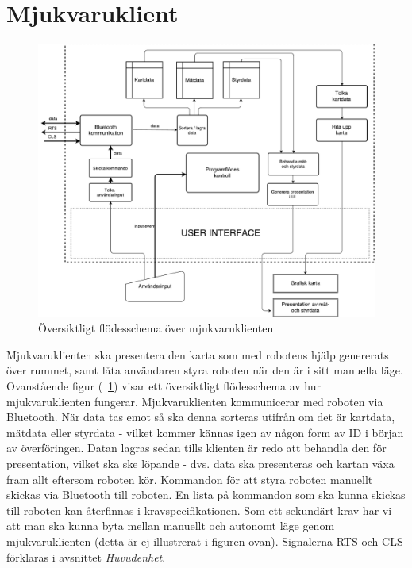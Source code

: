 \documentclass{article}
\begin{document}
\section{Mjukvaruklient}
\begin{figure}[H]
\centering
\includegraphics[scale=0.4]{mjukvaruklient_flowchart3}
\caption{Översiktligt flödesschema över mjukvaruklienten}
\label{fig:mjukvaruklient}
\end{figure}
Mjukvaruklienten ska presentera den karta som med robotens hjälp genererats över rummet, samt låta användaren styra roboten när den är i sitt manuella läge. Ovanstående figur (~\ref{fig:mjukvaruklient}) visar ett översiktligt flödesschema av hur mjukvaruklienten fungerar. Mjukvaruklienten kommunicerar med roboten via Bluetooth. När data tas emot så ska denna sorteras utifrån om det är kartdata, mätdata eller styrdata - vilket kommer kännas igen av någon form av ID i början av överföringen. Datan lagras sedan tills klienten är redo att behandla den för presentation, vilket ska ske löpande - dvs. data ska presenteras och kartan växa fram allt eftersom roboten kör. Kommandon för att styra roboten manuellt skickas via Bluetooth till roboten. En lista på kommandon som ska kunna skickas till roboten kan återfinnas i kravspecifikationen. Som ett sekundärt krav har vi att man ska kunna byta mellan manuellt och autonomt läge genom mjukvaruklienten (detta är ej illustrerat i figuren ovan). Signalerna RTS och CLS förklaras i avsnittet \textit{Huvudenhet}. 
\end{document}
